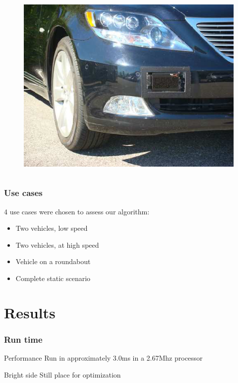 \documentclass{beamer}
\begin{document}
\begin{frame}
\begin{columns}[t]
		  \begin{column}{5cm}
		  \begin{figure}[h]
			\center
			\includegraphics[scale=0.26]{../img/testbed:ibeo}
		  \end{figure}   
		  \end{column}
		 \end{columns} 			
		 
	\end{frame}	

	\begin{frame}
		\frametitle{Use cases}
		4 use cases were chosen to assess our algorithm:
		\begin{itemize}
		\item Two vehicles, low speed
		\item Two vehicles, at high speed
		\item Vehicle on a roundabout
		\item Complete static scenario
		\end{itemize}						
	\end{frame}

\section{Results}

	\begin{frame}
		\frametitle{Run time}

		\begin{alertblock}{Performance}
			Run in approximately 3.0ms in a 2.67Mhz processor
		\end{alertblock}		
		
		\begin{exampleblock}{Bright side}
			Still place for optimization
		\end{exampleblock}				
		
	\end{frame}	
\end{document}

